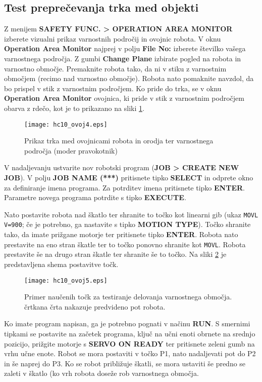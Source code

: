 \subsection*{Test preprečevanja trka med objekti}

Z menijem \textbf{SAFETY FUNC. > OPERATION AREA MONITOR} izberete vizualni prikaz varnostnih področij in ovojnic robota. V oknu \textbf{Operation Area Monitor} najprej v polju \textbf{File No:} izberete številko vašega varnostnega področja. Z gumbi \textbf{Change Plane} izbirate pogled na robota in  varnostno območje. Premaknite robota tako, da ni v stiku z varnostnim območjem (recimo nad varnostno območje). Robota nato pomaknite navzdol, da bo prispel v stik z varnostnim področjem. Ko pride do trka, se v oknu \textbf{Operation Area Monitor} ovojnica, ki pride v stik z varnostnim področjem obarva z rdečo, kot je to prikazano na sliki \ref{fig:hc10_ovoj4}.

\begin{figure}[!hbt]
	\centering
	\texttt{[image: hc10\_ovoj4.eps]}
	\caption{Prikaz trka med ovojnicami robota in orodja ter varnostnega področja (moder pravokotnik)}
	\label{fig:hc10_ovoj4}
\end{figure}

V nadaljevanju ustvarite nov robotski program (\textbf{JOB > CREATE NEW JOB}). V polju \textbf{JOB NAME (***)} pritisnete tipko \textbf{SELECT} in odprete okno za
definiranje imena programa. Za potrditev imena pritisnete tipko \textbf{ENTER}. Parametre novega programa potrdite s tipko \textbf{EXECUTE}.

Nato postavite robota nad škatlo ter shranite to točko kot linearni gib (ukaz \verb"MOVL V=900"; če je potrebno, ga nastavite s tipko \textbf{MOTION TYPE}). Točko shranite tako, da imate prižgane motorje ter pritisnete tipko \textbf{ENTER}. Robota nato prestavite na eno stran škatle ter to točko ponovno shranite kot \verb"MOVL". Robota prestavite še na drugo stran škatle ter shranite še to točko. Na sliki \ref{fig:hc10_ovoj5} je predstavljena shema postavitve točk.

\begin{figure}[!hbt]
	\centering
	\texttt{[image: hc10\_ovoj5.eps]}
	\caption{Primer naučenih točk za testiranje delovanja varnostnega območja. črtkana črta nakazuje predvideno pot robota.}
	\label{fig:hc10_ovoj5}
\end{figure}

Ko imate program napisan, ga je potrebno pognati v načinu \textbf{RUN}. S smernimi tipkami se postavite na začetek programa, ključ na učni enoti obrnete na srednjo pozicijo, prižgite motorje s \textbf{SERVO ON READY} ter pritisnete zeleni gumb na vrhu učne enote. Robot se mora postaviti v točko P1, nato nadaljevati pot do P2 in še naprej do P3. Ko se robot približuje škatli, se mora ustaviti še predno se zaleti v škatlo (ko vrh robota doseže rob varnostnega območja.


